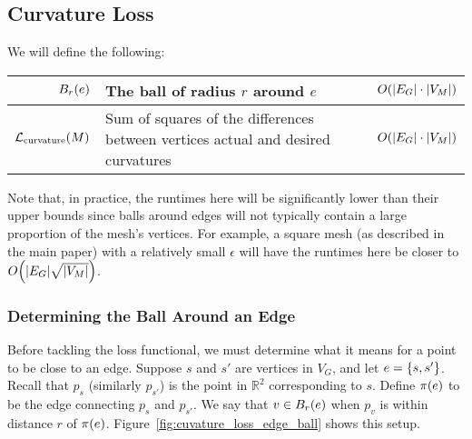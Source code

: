 \subsection{Curvature Loss}

We will define the following: \begin{center}\begin{tabular}{r|l|l}
	\(B_r\pof{e}\) & The ball of radius \(r\) around \(e\) & \(O\pof{\abs{E_G} \cdot \abs{V_M}}\) \\ \hline
	\(\mathcal{L}_{\mathrm{curvature}}\pof{M}\) & Sum of squares of the differences between vertices actual and desired curvatures & \(O\pof{\abs{E_G} \cdot \abs{V_M}}\)
\end{tabular}\end{center} Note that, in practice, the runtimes here will be significantly lower than their upper bounds since balls around edges will not typically contain a large proportion of the mesh's vertices. For example, a square mesh (as described in the main paper) with a relatively small \(\epsilon\) will have the runtimes here be closer to \(O\pof{\abs{E_G}\sqrt{\abs{V_M}}}\).

\subsubsection{Determining the Ball Around an Edge}

Before tackling the loss functional, we must determine what it means for a point to be close to an edge. Suppose \(s\) and \(s'\) are vertices in \(V_G\), and let \(e = \cof{s, s'}\). Recall that \(p_s\) (similarly \(p_{s'}\)) is the point in \(\mathbb{R}^2\) corresponding to \(s\). Define \(\pi\pof{e}\) to be the edge connecting \(p_s\) and \(p_{s'}\). We say that \(v \in B_r\pof{e}\) when \(p_v\) is within distance \(r\) of \(\pi\pof{e}\). Figure~\ref{fig:cuvature_loss_edge_ball} shows this setup.

